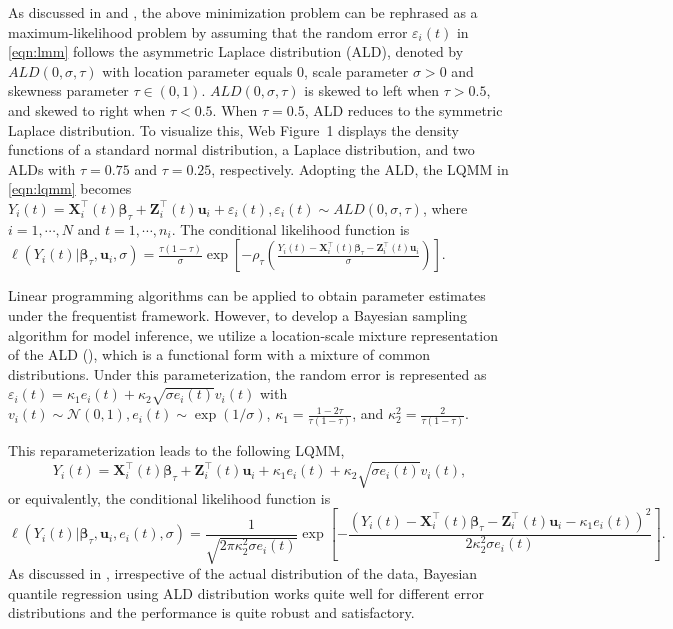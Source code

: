 As discussed in \citet{koenker1999goodness} and \citet{yu2001bayesian}, the above minimization problem can be rephrased as a maximum-likelihood problem by assuming that the random error $\varepsilon_{i}(t)$ in \eqref{eqn:lmm} follows the asymmetric Laplace distribution (ALD), denoted by $ALD(0, \sigma, \tau)$ with location parameter equals 0, scale parameter $\sigma>0$ and skewness parameter $\tau\in (0, 1)$. $ALD(0, \sigma, \tau)$ is skewed to left when $\tau>0.5$, and skewed to right when $\tau<0.5$. When $\tau=0.5$, ALD reduces to the symmetric Laplace distribution. To visualize this, Web Figure~1 displays the density functions of a standard normal distribution, a Laplace distribution, and two ALDs with $\tau=0.75$ and $\tau=0.25$, respectively. Adopting the ALD, the LQMM in \eqref{eqn:lqmm} becomes $Y_{i}(t) ={\boldsymbol X}_{i}^{\top}(t) \boldsymbol{\beta}_{\tau}+ {\boldsymbol Z}_{i}^{\top}(t)\boldsymbol{u}_i + \varepsilon_{i}(t), \varepsilon_{i}(t)\sim ALD(0, \sigma, \tau)$, where $i=1, \cdots, N$ and $t=1,\cdots, n_i$. The conditional likelihood function is $\ell(Y_{i}(t)|\boldsymbol{\beta}_{\tau},\boldsymbol{u}_i,\sigma)=\frac{\tau(1-\tau)}{\sigma}\exp\left[-\rho_{\tau}\left(\frac{Y_{i}(t)-{\boldsymbol X}_{i}^{\top}(t)\boldsymbol{\beta}_{\tau}-{\boldsymbol Z}_{i}^{\top}(t)\boldsymbol{u}_i}{\sigma}\right)\right]$.

Linear programming algorithms can be applied to obtain parameter estimates under the frequentist framework. However, to develop a Bayesian sampling algorithm for model inference, we utilize a location-scale mixture representation of the ALD (\citealp{kotz2001laplace}), which is a functional form with a mixture of common distributions. Under this parameterization, the random error is represented as $\varepsilon_{i}(t)=\kappa_1e_{i}(t)+\kappa_2\sqrt{\sigma e_{i}(t)}v_{i}(t)$ with $v_{i}(t)\sim \mathcal{N}(0,1), e_{i}(t)\sim\exp(1/\sigma)$, $\kappa_1=\frac{1-2\tau}{\tau(1-\tau)}$, and $\kappa_2^2=\frac{2}{\tau(1-\tau)}$.

This reparameterization leads to the following LQMM,
\begin{equation}\label{eqn:reformald2}
Y_{i}(t)={\boldsymbol X}_{i}^{\top}(t)\boldsymbol{\beta}_{\tau}+{\boldsymbol Z}_{i}^{\top}(t)\boldsymbol{u}_i+\kappa_1e_{i}(t)+\kappa_2\sqrt{\sigma e_{i}(t)}v_{i}(t),
\end{equation}
or equivalently, the conditional likelihood function is
\begin{equation}\label{eqn:lo_sc_lh}
\ell(Y_{i}(t)|\boldsymbol{\beta}_{\tau},\boldsymbol{u}_i,e_{i}(t),\sigma)=\frac{1}{\sqrt{2\pi\kappa_2^2\sigma e_{i}(t)}}\exp\left[-\frac{(Y_{i}(t)-{\boldsymbol X}_{i}^{\top}(t)\boldsymbol{\beta}_{\tau}-{\boldsymbol Z}_{i}^{\top}(t)\boldsymbol{u}_i-\kappa_1e_{i}(t))^2}{2\kappa_2^2\sigma e_{i}(t)}\right].
\end{equation}
As discussed in \cite{yu2001bayesian}, irrespective of the actual distribution of the data, Bayesian quantile regression using ALD distribution works quite well for different error distributions and the performance is quite robust and satisfactory.

